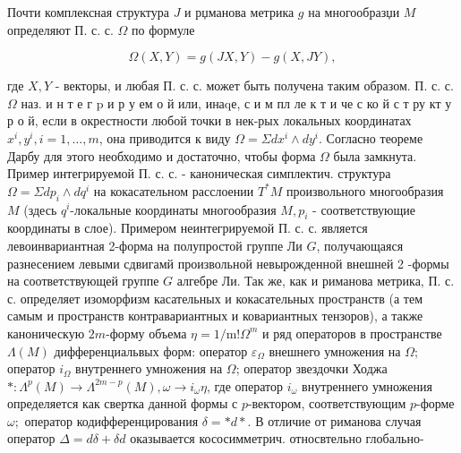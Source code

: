 \documentclass[10pt]{article}
\begin{document}
Почти комплексная структура $J$ и рџманова метрика $g$ на многообразџи $M$ определяют П. с. с. $\Omega$ по формуле



\[

\Omega(X, Y)=g(J X, Y)-g(X, J Y),

\]



где $X, Y$ - векторы, и любая П. с. с. может быть получена таким образом. П. с. с. $\Omega$ наз. и н т е г p и р у ем о й или, инаqе, с и м пл ле к т и че с ко й с т ру кт у р о й, если в окрестности любой точки в нек-рых локальных координатах $x^{i}, y^{i}, i=1, \ldots, m$, она приводится к виду $\Omega=\Sigma d x^{i} \wedge d y^{i}$. Согласно теореме Дарбу для этого необходимо и достаточно, чтобы форма $\Omega$ была замкнута. Пример интегрируемой П. с. с. - каноническая симплектич. структура $\Omega=\Sigma d p_{i} \wedge d q^{i}$ на кокасательном расслоении $T^{*} M$ произвольного многообразия $M$ (здесь $q^{i}$-локальные координаты многообразия $M, p_{i}$ - соответствующие координаты в слое). Примером неинтегрируемой П. с. с. является левоинвариантная 2-форма на полупростой группе Ли $G$, получающаяся разнесением левыми сдвигамй произвольной невырожденной внешней 2 -формы на соответствующей группе $G$ алгебре Ли. Так же, как и риманова метрика, П. с. с. определяет изоморфизм касательных и кокасательных пространств (а тем самым и пространств контравариантных и ковариантных тензоров), а также каноническую $2 m$-форму объема $\eta=1 / \mathrm{m} ! \Omega^{m}$ и ряд операторов в пространстве $\Lambda(M)$ дифференциальвых форм: оператор $\varepsilon_{\Omega}$ внешнего умножения на $\Omega$; оператор $i_{\Omega}$ внутреннего умножения на $\Omega$; оператор звездочки Ходжа $*: \Lambda^{p}(M) \rightarrow \Lambda^{2 m-p}(M), \omega \rightarrow i_{\omega} \eta$, где оператор $i_{\omega}$ внутреннего умножения определяется как свертка данной формы с $p$-вектором, соответствующим $p$-форме $\omega ;$ оператор кодифференцирования $\delta=* d *$. В отличие от риманова случая оператор $\Delta=d \delta+\delta d$ оказывается кососимметрич. относвтельно глобально-
\end{document}
